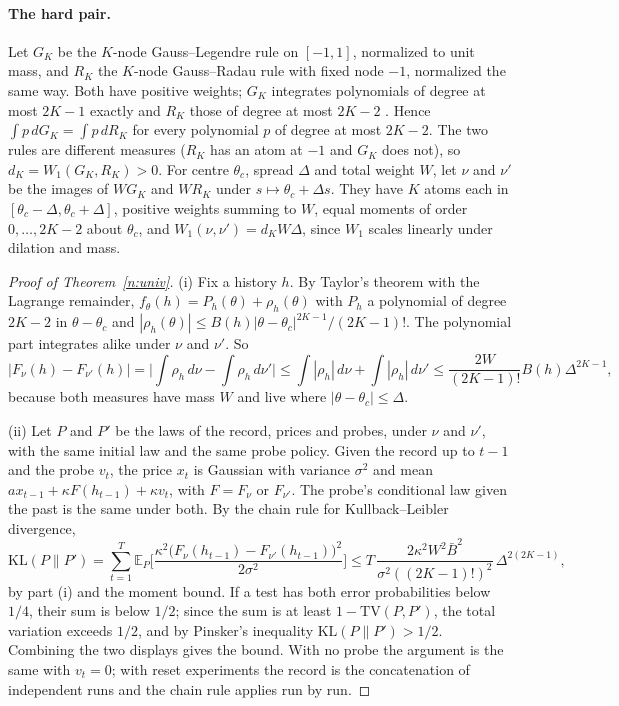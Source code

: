 \documentclass[12pt]{article}
\theoremstyle{definition}
\theoremstyle{remark}
\begin{document}
\paragraph{The hard pair.} Let $G_K$ be the $K$-node Gauss--Legendre rule on $[-1,1]$, normalized to unit mass, and $R_K$ the $K$-node Gauss--Radau rule with fixed node $-1$, normalized the same way. Both have positive weights; $G_K$ integrates polynomials of degree at most $2K-1$ exactly and $R_K$ those of degree at most $2K-2$ \citep[Section~3.4]{szego1975}. Hence $\int p\,dG_K=\int p\,dR_K$ for every polynomial $p$ of degree at most $2K-2$. The two rules are different measures ($R_K$ has an atom at $-1$ and $G_K$ does not), so $d_K=W_1(G_K,R_K)>0$. For centre $\theta_c$, spread $\Delta$ and total weight $W$, let $\nu$ and $\nu'$ be the images of $WG_K$ and $WR_K$ under $s\mapsto\theta_c+\Delta s$. They have $K$ atoms each in $[\theta_c-\Delta,\theta_c+\Delta]$, positive weights summing to $W$, equal moments of order $0,\ldots,2K-2$ about $\theta_c$, and $W_1(\nu,\nu')=d_KW\Delta$, since $W_1$ scales linearly under dilation and mass.

\begin{proof}[Proof of Theorem~\ref{n:univ}]
(i) Fix a history $h$. By Taylor's theorem with the Lagrange remainder, $f_\theta(h)=P_h(\theta)+\rho_h(\theta)$ with $P_h$ a polynomial of degree $2K-2$ in $\theta-\theta_c$ and $|\rho_h(\theta)|\le B(h)|\theta-\theta_c|^{2K-1}/(2K-1)!$. The polynomial part integrates alike under $\nu$ and $\nu'$. So
\[
|F_\nu(h)-F_{\nu'}(h)|=\Big|\int\rho_h\,d\nu-\int\rho_h\,d\nu'\Big|\le\int|\rho_h|\,d\nu+\int|\rho_h|\,d\nu'\le\frac{2W}{(2K-1)!}B(h)\Delta^{2K-1},
\]
because both measures have mass $W$ and live where $|\theta-\theta_c|\le\Delta$.

(ii) Let $P$ and $P'$ be the laws of the record, prices and probes, under $\nu$ and $\nu'$, with the same initial law and the same probe policy. Given the record up to $t-1$ and the probe $v_t$, the price $x_t$ is Gaussian with variance $\sigma^2$ and mean $ax_{t-1}+\kappa F(h_{t-1})+\kappa v_t$, with $F=F_\nu$ or $F_{\nu'}$. The probe's conditional law given the past is the same under both. By the chain rule for Kullback--Leibler divergence,
\[
\mathrm{KL}(P\|P')=\sum_{t=1}^{T}\mathbb E_P\Big[\frac{\kappa^2\big(F_\nu(h_{t-1})-F_{\nu'}(h_{t-1})\big)^2}{2\sigma^2}\Big]\le T\,\frac{2\kappa^2W^2\bar B^2}{\sigma^2((2K-1)!)^2}\,\Delta^{2(2K-1)},
\]
by part (i) and the moment bound. If a test has both error probabilities below $1/4$, their sum is below $1/2$; since the sum is at least $1-\mathrm{TV}(P,P')$, the total variation exceeds $1/2$, and by Pinsker's inequality $\mathrm{KL}(P\|P')>1/2$. Combining the two displays gives the bound. With no probe the argument is the same with $v_t=0$; with reset experiments the record is the concatenation of independent runs and the chain rule applies run by run.
\end{proof}
\end{document}
